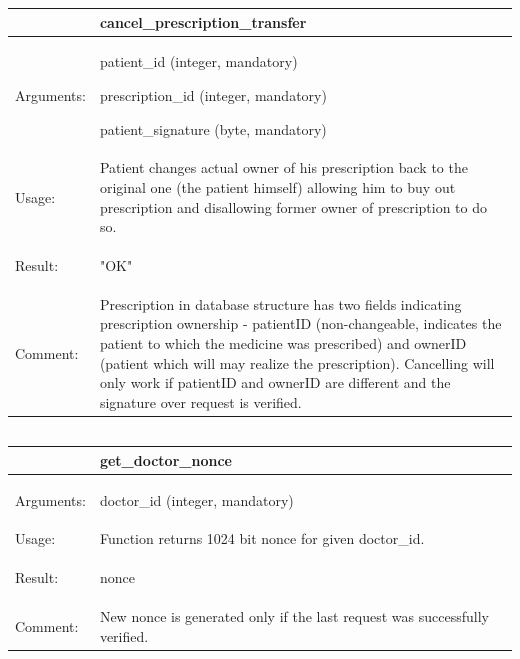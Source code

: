     \begin{longtable}{| p{3cm} | p{10.75cm} |}
    \hline
     & cancel\_prescription\_transfer \\ \hline
    Arguments: &  \begin{packed_enum}
    	\item patient\_id (integer, mandatory)
		\item prescription\_id (integer, mandatory)
		\item patient\_signature (byte, mandatory)
	\end{packed_enum}     \\ \hline
    Usage: & Patient changes actual owner of his prescription back to the original one (the patient himself) allowing him to buy out prescription and disallowing former owner of prescription to do so. \\ \hline
    Result: & \begin{packed_enum}
    	\item "OK"
	\end{packed_enum}     \\ \hline	
		Comment: & Prescription in database structure has two fields indicating prescription ownership - patientID (non-changeable, indicates the patient to which the medicine was prescribed) and ownerID (patient which will may realize the prescription). Cancelling will only work if patientID and ownerID are different and the signature over request is verified. \\ \hline
    \end{longtable}

\subsection{}


    \begin{longtable}{| p{3cm} | p{10.75cm} |}
    \hline
     & get\_doctor\_nonce \\ \hline
    Arguments: &  \begin{packed_enum}
    	\item doctor\_id (integer, mandatory)
	\end{packed_enum}     \\ \hline
    Usage: & Function returns 1024 bit nonce for given doctor\_id. \\ \hline
    Result: & \begin{packed_enum}
    	\item nonce
	\end{packed_enum}     \\ \hline	
			Comment: & New nonce is generated only if the last request was successfully verified.\\ \hline
    \end{longtable}



